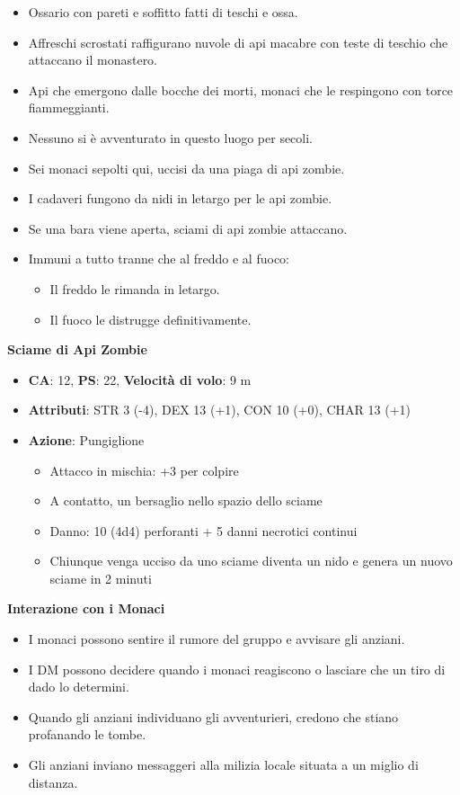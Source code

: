 \documentclass{article}
\begin{document}
\begin{itemize}
    \item Ossario con pareti e soffitto fatti di teschi e ossa.
    \item Affreschi scrostati raffigurano nuvole di api macabre con teste di teschio che attaccano il monastero.
    \item Api che emergono dalle bocche dei morti, monaci che le respingono con torce fiammeggianti.
    \item Nessuno si è avventurato in questo luogo per secoli.
    \item Sei monaci sepolti qui, uccisi da una piaga di api zombie.
    \item I cadaveri fungono da nidi in letargo per le api zombie.
    \item Se una bara viene aperta, sciami di api zombie attaccano.
    \item Immuni a tutto tranne che al freddo e al fuoco:
    \begin{itemize}
        \item Il freddo le rimanda in letargo.
        \item Il fuoco le distrugge definitivamente.
    \end{itemize}
\end{itemize}

\textbf{Sciame di Api Zombie}
\begin{itemize}
    \item \textbf{CA}: 12, \textbf{PS}: 22, \textbf{Velocità di volo}: 9 m
    \item \textbf{Attributi}: STR 3 (-4), DEX 13 (+1), CON 10 (+0), CHAR 13 (+1)
    \item \textbf{Azione}: Pungiglione
    \begin{itemize}
        \item Attacco in mischia: +3 per colpire
        \item A contatto, un bersaglio nello spazio dello sciame
        \item Danno: 10 (4d4) perforanti + 5 danni necrotici continui
        \item Chiunque venga ucciso da uno sciame diventa un nido e genera un nuovo sciame in 2 minuti
    \end{itemize}
\end{itemize}

\textbf{Interazione con i Monaci}

\begin{itemize}
    \item I monaci possono sentire il rumore del gruppo e avvisare gli anziani.
    \item I DM possono decidere quando i monaci reagiscono o lasciare che un tiro di dado lo determini.
    \item Quando gli anziani individuano gli avventurieri, credono che stiano profanando le tombe.
    \item Gli anziani inviano messaggeri alla milizia locale situata a un miglio di distanza.
\end{itemize}
\end{document}
